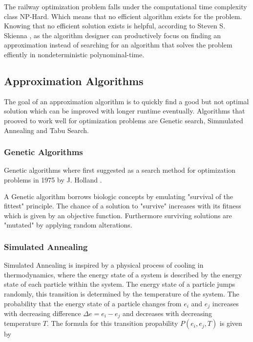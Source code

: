 \documentclass[a4paper,10pt,parskip]{article}
\begin{document}
The railway optimization problem falls under the computational time complexity 
class NP-Hard. Which means that no efficient algorithm exists for the problem. 
Knowing that no efficient solution exists is helpful, according to 
Steven S. Skienna \cite{skienna08}, as the algorithm designer can productively 
focus on finding an approximation instead of searching for an algorithm that 
solves the problem effiently in nondeterministic polynominal-time.

\subsection{Approximation Algorithms}

The goal of an approximation algorithm is to quickly find a good but not optimal 
solution which can be improved with longer runtime eventually. Algorithms that 
prooved to work well for optimization problems are Genetic search, Simmulated 
Annealing and Tabu Search.

\subsubsection{Genetic Algorithms}

Genetic algorithms where first suggested as a search method for optimization 
problems in 1975 by J. Holland \cite{holland1975}.

A Genetic algorithm borrows biologic concepts by emulating "survival of the 
fittest" principle. The chance of a solution to "survive" increases with its 
fitness which is given by an objective function. Furthermore surviving solutions
are "mutated" by applying random alterations.

\subsubsection{Simulated Annealing}

Simulated Annealing is inspired by a physical process of cooling in thermodynamics, 
where the energy state of a system is described by the energy state of each 
particle within the system. The energy state of a particle jumps randomly, 
this transition is determined by the temperature of the system. The probability 
that the energy state of a particle changes from $e_i$ and $e_j$ increases with 
decreasing difference $\Delta e = e_i - e_j$ and decreases with decreasing 
temperature $T$. The formula for this transition propability $P(e_i, e_j, T)$ is 
given by
\end{document}
